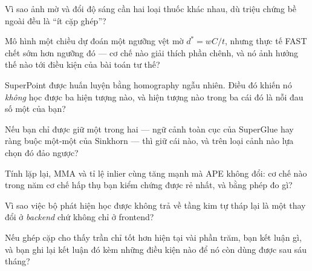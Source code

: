 \documentclass[../../deep_learning.tex]{subfiles}
\begin{document}
\begin{tukiem}
\item Vì sao ảnh mờ và đổi độ sáng cần hai loại thuốc khác nhau, dù triệu chứng bề ngoài đều là ``ít cặp ghép''?
\item Mô hình một chiều dự đoán một ngưỡng vệt mờ \(d^{*}=wC/t\), nhưng thực tế FAST chết sớm hơn ngưỡng đó --- cơ chế nào giải thích phần chênh, và nó ảnh hưởng thế nào tới điều kiện của bài toán tư thế?
\item SuperPoint được huấn luyện bằng homography ngẫu nhiên. Điều đó khiến nó \emph{không} học được ba hiện tượng nào, và hiện tượng nào trong ba cái đó là nỗi đau số một của bạn?
\item Nếu bạn chỉ được giữ một trong hai --- ngữ cảnh toàn cục của SuperGlue hay ràng buộc một-một của Sinkhorn --- thì giữ cái nào, và trên loại cảnh nào lựa chọn đó đảo ngược?
\item Tính lặp lại, MMA và tỉ lệ inlier cùng tăng mạnh mà APE không đổi: cơ chế nào trong năm cơ chế hấp thụ bạn kiểm chứng được rẻ nhất, và bằng phép đo gì?
\item Vì sao việc bộ phát hiện học được không trả về tầng kim tự tháp lại là một thay đổi ở \emph{backend} chứ không chỉ ở frontend?
\item Nếu  ghép cặp cho thấy trần chỉ tốt hơn hiện tại vài phần trăm, bạn kết luận gì, và bạn ghi lại kết luận đó kèm những điều kiện nào để nó còn dùng được sau sáu tháng?
\end{tukiem}
\ifSubfilesClassLoaded{\printbibliography[title={Nguồn}]}{}
\end{document}
